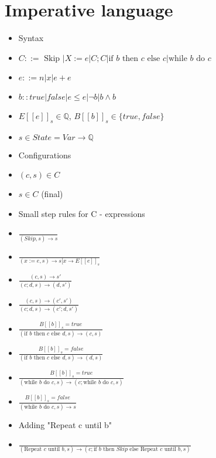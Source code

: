 \documentclass{article}
\begin{document}
\section{Imperative language}
\begin{itemize}
	\item Syntax
\item $C::=\text{ Skip }| X:=e|C;C|\text{if }b\text{ then }c\text{ else }c |\text{while }b\text{ do }c$
\item $e::= n|x|e+e$
\item $b::true|false|e\leq e|\neg b | b\wedge b$
\item $ E[[e]]_{s}\in\mathbb{Q} $, $ B[[b]]_{s}\in\{true, false\} $
\item $ s\in State = Var\rightarrow \mathbb{Q} $
\item Configurations
\item $ (c, s)\in C $
\item $ s\in C$ (final) 
\item Small step rules for C - expressions
\item $\frac{}{(Skip, s)\rightarrow s}$
\item $\frac{}{(x:=e, s)\rightarrow s[x\rightarrow E[[e]]_{s}}$
\item $\frac{(c, s)\rightarrow s'}{(c;d, s)\rightarrow (d, s')}$
\item $\frac{(c, s)\rightarrow (c', s')}{(c;d, s)\rightarrow (c';d, s')}$
\item $\frac{B[[b]]_{s}=true}{(\text{if }b\text{ then }c\text{ else }d , s)\rightarrow (c, s)}$
\item $\frac{B[[b]]_{s}=false}{(\text{if }b\text{ then }c\text{ else }d , s)\rightarrow (d, s)}$
\item $\frac{B[[b]]_{s}=true}{(\text{while }b\text{ do }c, s)\rightarrow (c; \text{while }b\text{ do }c, s)}$
\item $\frac{B[[b]]_{s}=false}{(\text{while }b\text{ do }c , s)\rightarrow s}$
\item Adding "Repeat c until b"
\item $\frac{}{(\text{Repeat }c\text{ until }b, s)\rightarrow (c ; \text{if }b\text{ then }Skip\text{ else }\text{Repeat }c\text{ until }b, s)}$
\end{itemize}
\end{document}
